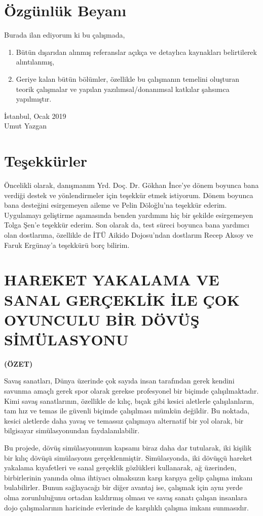 \documentclass[a4paper, 12pt, titlepage]{article}
\newcommand{\theturkishtitle}{HAREKET YAKALAMA VE SANAL GERÇEKLİK İLE ÇOK OYUNCULU BİR DÖVÜŞ
                              SİMÜLASYONU}
\newcommand{\theauthor}{Umut Yazgan}
\newcommand{\theturkishdate}{Ocak 2019}
\begin{document}
\newpage
\section*{Özgünlük Beyanı}
Burada ilan ediyorum ki bu çalışmada,
\begin{enumerate}
    \item Bütün dışarıdan alınmış referanslar açıkça ve detaylıca kaynakları belirtilerek
          alıntılanmış,
    \item Geriye kalan bütün bölümler, özellikle bu çalışmanın temelini oluşturan teorik çalışmalar
          ve yapılan yazılımsal/donanımsal katkılar şahsımca yapılmıştır.

\end{enumerate}
\vspace{1em}
İstanbul, \theturkishdate
\vspace{3em}\\ \theauthor

\newpage
\section*{Teşekkürler}
Öncelikli olarak, danışmanım Yrd. Doç. Dr. Gökhan İnce'ye dönem boyunca bana verdiği destek ve
yönlendirmeler için teşekkür etmek istiyorum. Dönem boyunca bana desteğini esirgemeyen aileme ve
Pelin Döloğlu'na teşekkür ederim. Uygulamayı geliştirme aşamasında benden yardımını hiç bir şekilde
esirgemeyen Tolga Şen'e teşekkür ederim. Son olarak da, test süreci boyunca bana yardımcı olan
dostlarıma, özellikle de İTÜ Aikido Dojosu'ndan dostlarım Recep Aksoy ve Faruk Ergünay'a teşekkürü
borç bilirim.

\newpage
\section*{\centering\theturkishtitle}
\centerline{\fontsize{16pt}{21.6pt}\sffamily\bfseries (ÖZET)}
Savaş sanatları, Dünya üzerinde çok sayıda insan tarafından gerek kendini savunma amaçlı gerek spor
olarak gerekse profesyonel bir biçimde çalışılmaktadır. Kimi savaş sanatlarının, özellikle de
kılıç, bıçak gibi kesici aletlerle çalışılanların, tam hız ve temas ile güvenli biçimde çalışılması
mümkün değildir. Bu noktada, kesici aletlerde daha yavaş ve temassız çalışmaya alternatif bir yol
olarak, bir bilgisayar simülasyonundan faydalanılabilir.

Bu projede, dövüş simülasyonunun kapsamı biraz daha dar tutularak, iki kişilik bir kılıç dövüşü
simülasyonu gerçeklenmiştir. Simülasyonda, iki dövüşçü hareket yakalama kıyafetleri ve sanal
gerçeklik gözlükleri kullanarak, ağ üzerinden, birbirlerinin yanında olma ihtiyacı olmaksızın karşı
karşıya gelip çalışma imkanı bulabilirler. Bunun sağlayacağı bir diğer avantaj ise, çalışmak için
aynı yerde olma zorunluluğunu ortadan kaldırmış olması ve savaş sanatı çalışan insanlara dojo
çalışmalarının haricinde evlerinde de karşılıklı çalışma imkanı sunmasıdır.
\end{document}
